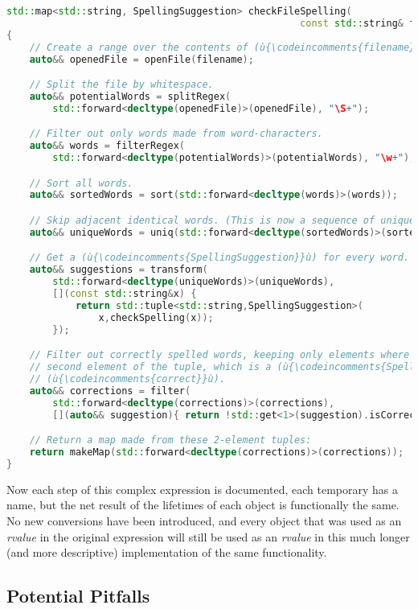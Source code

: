 \begin{lstlisting}[language=C++]
std::map<std::string, SpellingSuggestion> checkFileSpelling(
                                                   const std::string& filename)
{
    // Create a range over the contents of (ù{\codeincomments{filename}}ù).
    auto&& openedFile = openFile(filename);

    // Split the file by whitespace.
    auto&& potentialWords = splitRegex(
        std::forward<decltype(openedFile)>(openedFile), "\S+");

    // Filter out only words made from word-characters.
    auto&& words = filterRegex(
        std::forward<decltype(potentialWords)>(potentialWords), "\w+");

    // Sort all words.
    auto&& sortedWords = sort(std::forward<decltype(words)>(words));

    // Skip adjacent identical words. (This is now a sequence of unique words.)
    auto&& uniqueWords = uniq(std::forward<decltype(sortedWords)>(sortedWords));

    // Get a (ù{\codeincomments{SpellingSuggestion}}ù) for every word.
    auto&& suggestions = transform(
        std::forward<decltype(uniqueWords)>(uniqueWords),
        [](const std::string&x) {
            return std::tuple<std::string,SpellingSuggestion>(
                x,checkSpelling(x));
        });

    // Filter out correctly spelled words, keeping only elements where the
    // second element of the tuple, which is a (ù{\codeincomments{SpellingSuggestion}}ù), is not
    // (ù{\codeincomments{correct}}ù).
    auto&& corrections = filter(
        std::forward<decltype(corrections)>(corrections),
        [](auto&& suggestion){ return !std::get<1>(suggestion).isCorrect(); });

    // Return a map made from these 2-element tuples:
    return makeMap(std::forward<decltype(corrections)>(corrections));
}
\end{lstlisting}
    
\noindent Now each step of this complex expression is documented, each temporary
has a name, but the net result of the lifetimes of each object is
functionally the same. No new conversions have been introduced, and
every object that was used as an \emph{rvalue} in the original
expression will still be used as an \emph{rvalue} in this much longer
(and more descriptive) implementation of the same functionality.

\subsection[Potential Pitfalls]{Potential Pitfalls}\label{potential-pitfalls}

